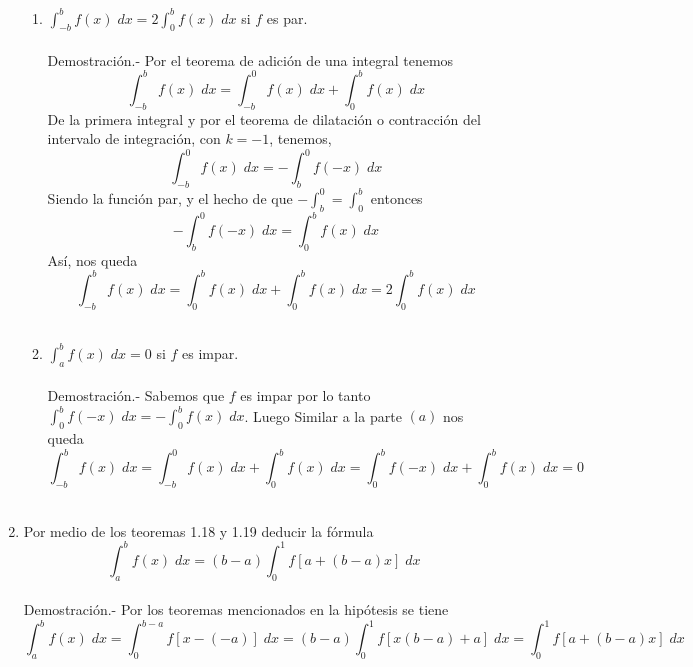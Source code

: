 \begin{enumerate}[\bfseries 1.]
\begin{enumerate}[\bfseries (a)]
	    \item $\displaystyle\int_{-b}^b f(x)\; dx = 2\int_0^b f(x)\; dx$ si $f$ es par.\\\\
		Demostración.-\; Por el teorema de adición de una integral tenemos $$\int_{-b}^b f(x) \; dx = \int_{-b}^0 f(x) \; dx + \int_0^b f(x) \; dx$$
		De la primera integral y por el teorema de dilatación o contracción del intervalo de integración, con $k=-1$, tenemos, $$\int_{-b}^0 f(x) \; dx = -\int_b^0 f(-x)\; dx$$ 
		Siendo la función par, y el hecho de que $-\int_b^0 = \int_0^b$ entonces  $$-\displaystyle\int_{b}^0 f(-x)\; dx = \int_0^b f(x) \; dx$$
		Así, nos queda $$\int_{-b}^b f(x) \; dx = \int_0^b f(x) \; dx + \int_0^b f(x) \; dx = 2\int_0^b f(x) \; dx$$\\

	    \item $\displaystyle\int_a^b f(x) \; dx = 0$ si $f$ es impar.\\\\
		Demostración.-\; Sabemos que $f$ es impar por lo tanto $\displaystyle\int_0^b f(-x)\; dx = -\int_0^b f(x) \; dx$. Luego Similar a la parte $(a)$ nos queda  
		$$\int_{-b}^b f(x)\; dx = \int_{-b}^0 f(x) \; dx + \int_0^b f(x) \;dx = \int_0^b f(-x)\; dx + \int_0^b f(x) \; dx = 0$$\\

	\end{enumerate}

    \item Por medio de los teoremas 1.18 y 1.19 deducir la fórmula $$\int_a^b f(x) \; dx = (b-a)\int_0^1 f[a+(b-a)x] \; dx$$\\
	Demostración.-\; Por los teoremas mencionados en la hipótesis se tiene $$\int_a^b f(x) \; dx = \int_0^{b-a} f[x-(-a)] \; dx = (b-a) \int_0^1 f[x(b-a)+a] \; dx = \int_0^1 f[a+(b-a)x] \; dx$$\\ 


\end{enumerate}
